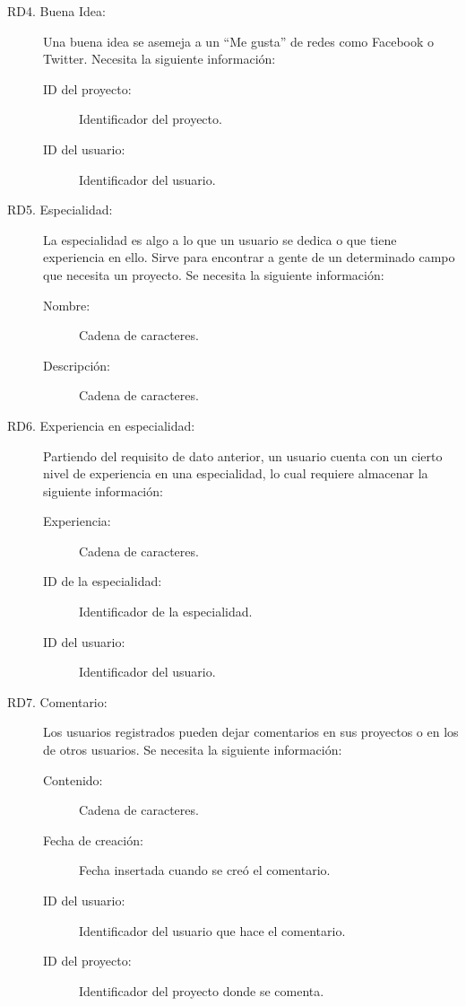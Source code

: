 \begin{description}
    \item[RD4. Buena Idea:] Una buena idea se asemeja a un ``Me gusta'' de redes como Facebook o Twitter. Necesita la siguiente información:
        \begin{description}
            \item[ID del proyecto:] Identificador del proyecto.
            \item[ID del usuario:] Identificador del usuario.
        \end{description}
    \item[RD5. Especialidad:] La especialidad es algo a lo que un usuario se dedica o que tiene experiencia en ello. Sirve para encontrar a gente de un determinado campo que necesita un proyecto. Se necesita la siguiente información:
        \begin{description}
            \item[Nombre:] Cadena de caracteres.
            \item[Descripción:] Cadena de caracteres.
        \end{description}
    \item[RD6. Experiencia en especialidad:] Partiendo del requisito de dato anterior, un usuario cuenta con un cierto nivel de experiencia en una especialidad, lo cual requiere almacenar la siguiente información:
        \begin{description}
            \item[Experiencia:] Cadena de caracteres.
            \item[ID de la especialidad:] Identificador de la especialidad.
            \item[ID del usuario:] Identificador del usuario.
        \end{description}
    \item[RD7. Comentario:] Los usuarios registrados pueden dejar comentarios en sus proyectos o en los de otros usuarios. Se necesita la siguiente información:
        \begin{description}
            \item[Contenido:] Cadena de caracteres.
            \item[Fecha de creación:] Fecha insertada cuando se creó el comentario.
            \item[ID del usuario:] Identificador del usuario que hace el comentario.
            \item[ID del proyecto:] Identificador del proyecto donde se comenta.
        \end{description}

\end{description}
